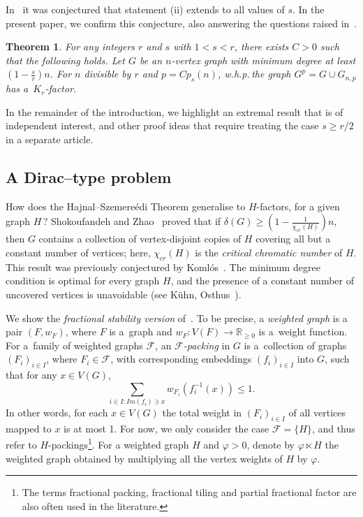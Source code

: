 \documentclass[reqno, 12pt]{amsart}
\numberwithin{equation}{section}
\numberwithin{figure}{section}
\theoremstyle{plain}
\newtheorem{thm}{Theorem}[section]
\theoremstyle{definition}
\let\phi=\varphi
\def\RR{\mathds R}
\def\cF{{\mathcal F}}
\def \Gnp{G_{n,p}}
\let\lra=\longrightarrow
\let\to=\lra
\let\R=\RR
\begin{document}
	In~\cite{akr24} it was conjectured that statement (ii) extends to all values of $s$. In the present paper, we confirm this conjecture, also answering the questions raised in~\cite{bpss23,hmt21}. 

    \begin{thm}\label{t:main}
		For any integers $r$ and $s$ with $1 < s < r$, there exists $C>0$ such that the following holds. Let $G$ be an $n$-vertex graph with minimum degree at least $\left(1 - \frac{s}{r} \right)n$. For $n$ divisible by $r$ and $p = Cp_s(n)$, w.h.p.\,the graph $G^p = G \cup \Gnp$ has a~$K_r$-factor.
	\end{thm}

    In the remainder of the introduction, we highlight an extremal result that is of independent interest, and other proof ideas that require treating the case $s \geq r/2$ in a separate article.

    \subsection*{A Dirac--type problem}
       
    How does the Hajnal--Szemere\'edi Theorem generalise to $H$-factors, for a given graph $H$\,? Shokoufandeh and Zhao~\cite{sz03} proved that if $\delta(G) \geq \left(1-\frac{1}{\chi_{cr}(H)} \right)n$, then $G$ contains a collection of vertex-disjoint copies of $H$ covering all but a constant number of vertices; here, $\chi_{cr}(H)$ is the \textit{critical chromatic number} of $H$. This result was previously conjectured by Koml\'os~\cite{komlos00}. The minimum degree condition is optimal for every graph $H$, and the presence of a constant number of uncovered vertices is unavoidable (see K\"uhn, Osthus~\cite{ko09}).
        
        
    We show the \textit{fractional stability version} of~\cite{sz03}. To be precise, a \emph{weighted graph} is a pair $(F, w_F)$, where $F$ is a~graph and $w_F: V(F) \to \R_{\geq 0}$ is a~weight function.
    For a~family of weighted graphs $\cF$, an \emph{$\cF$-packing} in $G$ is a~collection of graphs $(F_i)_{i \in I}$, where $F_i \in \cF$, with corresponding embeddings $(f_i)_{i \in I}$ into $G$, such that for any $x \in V(G)$, 
    $$\sum_{i \in I: Im (f_i) \ni x} w_{F_i}(f_i^{-1}(x)) \leq 1.$$
    In other words, for each $x \in V(G)$ the total weight in $(F_i)_{i\in I}$ of all vertices mapped to $x$ is at most 1. For now, we only consider the case $\cF=\{H\}$, and thus refer to $H$-packings\footnote{The terms fractional packing, fractional tiling and partial fractional factor are also often used in the literature.}.
    For a weighted graph $H$ and $\phi > 0 $, denote by $\phi\ltimes H$ the weighted graph obtained by multiplying all the vertex weights of $H$ by $\phi$.
\end{document}
